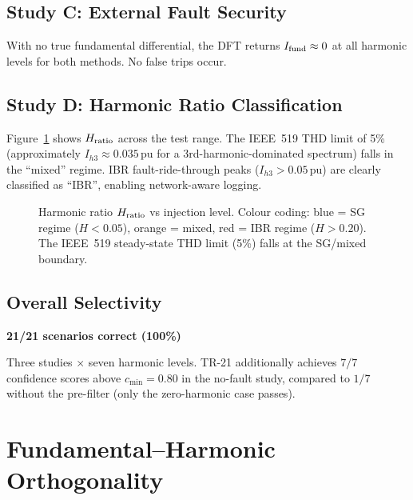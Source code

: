 \documentclass[11pt, a4paper]{article}
\begin{document}
\subsection{Study C: External Fault Security}

With no true fundamental differential, the DFT returns $I_{\rm fund} \approx 0$
at all harmonic levels for both methods.  No false trips occur.

\subsection{Study D: Harmonic Ratio Classification}

Figure~\ref{fig:hratio} shows $H_{\rm ratio}$ across the test range.  The
IEEE~519 THD limit of 5\% (approximately $I_{h3} \approx 0.035$\,pu for a
3rd-harmonic-dominated spectrum) falls in the ``mixed'' regime.  IBR
fault-ride-through peaks ($I_{h3} > 0.05$\,pu) are clearly classified as
``IBR'', enabling network-aware logging.

\begin{figure}[h]
  \centering
  
  \caption{Harmonic ratio $H_{\rm ratio}$ vs injection level.
           Colour coding: blue = SG regime ($H < 0.05$),
           orange = mixed, red = IBR regime ($H > 0.20$).
           The IEEE~519 steady-state THD limit (5\%) falls at the
           SG/mixed boundary.}
  \label{fig:hratio}
\end{figure}

\subsection{Overall Selectivity}

\begin{center}
\Large
\textbf{\textcolor{okgreen}{21/21 scenarios correct (100\%)}}
\end{center}

Three studies $\times$ seven harmonic levels.  TR-21 additionally achieves
$7/7$ confidence scores above $c_{\min}=0.80$ in the no-fault study,
compared to $1/7$ without the pre-filter (only the zero-harmonic case passes).


\section{Fundamental–Harmonic Orthogonality}
\label{sec:orthogonality}
\end{document}
